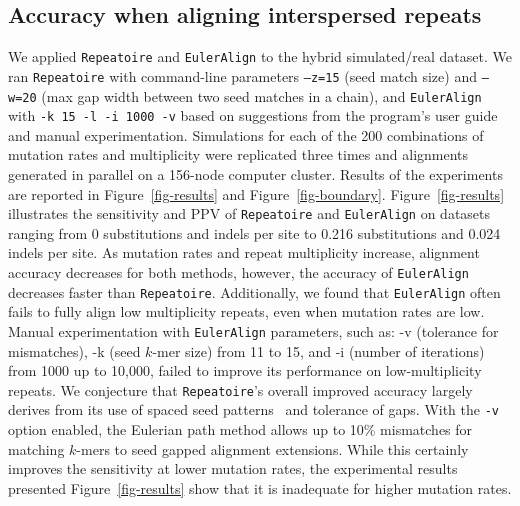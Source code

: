 \documentclass[12pt,journal,letterpaper,onecolumn, draftcls]{IEEEtran}
\begin{document}
\subsection*{Accuracy when aligning interspersed repeats}
We applied \texttt{Repeatoire} and \texttt{EulerAlign} to the
hybrid simulated/real dataset.  We ran \texttt{Repeatoire}
with command-line parameters \texttt{--z=15} (seed match size) and \texttt{--w=20} (max gap width between two seed matches in a chain), and
\texttt{EulerAlign} with \texttt{-k 15 -l -i 1000 -v} based on suggestions
from the program's user guide and manual experimentation.
Simulations for each of the 200 combinations of mutation rates and
multiplicity were replicated three times and alignments generated in
parallel on a 156-node computer cluster.   Results of the experiments
are reported in Figure~\ref{fig-results} and
Figure~\ref{fig-boundary}. Figure~\ref{fig-results} illustrates the
sensitivity and PPV of
\texttt{Repeatoire} and
\texttt{EulerAlign} on datasets ranging from 0 substitutions and
indels per site to 0.216 substitutions and 0.024 indels per site.  As
mutation rates and repeat multiplicity increase, alignment accuracy
decreases for both methods, however, the accuracy of \texttt{EulerAlign}
decreases faster than \texttt{Repeatoire}. Additionally, we found that \texttt{EulerAlign}
often fails to fully align low multiplicity repeats, even when mutation rates are low.
Manual experimentation with \texttt{EulerAlign} parameters, such as: -v (tolerance for mismatches), -k (seed $k$-mer size) from 11 to 15, and -i (number of iterations) from 1000 up to 10,000, failed to improve its performance on low-multiplicity repeats.
We conjecture that \texttt{Repeatoire}'s overall improved accuracy largely derives
from its use of spaced seed patterns~\cite{ref-procrast} and tolerance
of gaps. With the \texttt{-v} option enabled, the Eulerian path method allows up to 10\% mismatches for matching $k$-mers to seed gapped alignment extensions. While this certainly improves the sensitivity at lower mutation rates, the experimental results presented Figure~\ref{fig-results} show that it is inadequate for higher mutation rates.
\end{document}
